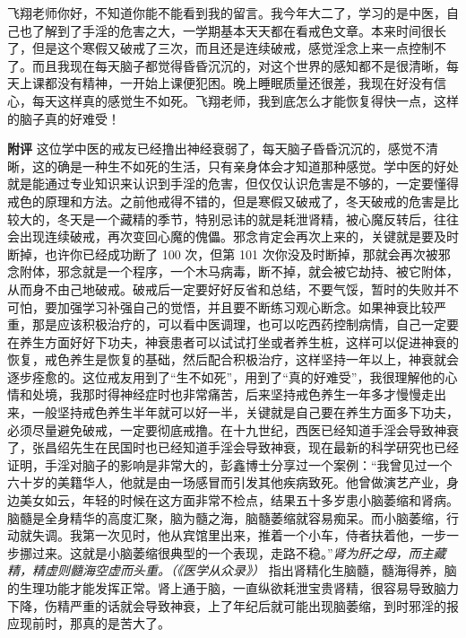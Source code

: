 \begin{case}
    飞翔老师你好，不知道你能不能看到我的留言。我今年大二了，学习的是中医，自己也了解到了手淫的危害之大，一学期基本天天都在看戒色文章。本来时间很长了，但是这个寒假又破戒了三次，而且还是连续破戒，感觉淫念上来一点控制不了。而且我现在每天脑子都觉得昏昏沉沉的，对这个世界的感知都不是很清晰，每天上课都没有精神，一开始上课便犯困。晚上睡眠质量还很差，我现在好没有信心，每天这样真的感觉生不如死。飞翔老师，我到底怎么才能恢复得快一点，这样的脑子真的好难受！

    \textbf{附评} 这位学中医的戒友已经撸出神经衰弱了，每天脑子昏昏沉沉的，感觉不清晰，这的确是一种生不如死的生活，只有亲身体会才知道那种感觉。学中医的好处就是能通过专业知识来认识到手淫的危害，但仅仅认识危害是不够的，一定要懂得戒色的原理和方法。之前他戒得不错的，但是寒假又破戒了，冬天破戒的危害是比较大的，冬天是一个藏精的季节，特别忌讳的就是耗泄肾精，被心魔反转后，往往会出现连续破戒，再次变回心魔的傀儡。邪念肯定会再次上来的，关键就是要及时断掉，也许你已经成功断了 100 次，但第 101 次你没及时断掉，那就会再次被邪念附体，邪念就是一个程序，一个木马病毒，断不掉，就会被它劫持、被它附体，从而身不由己地破戒。破戒后一定要好好反省和总结，不要气馁，暂时的失败并不可怕，要加强学习补强自己的觉悟，并且要不断练习观心断念。如果神衰比较严重，那是应该积极治疗的，可以看中医调理，也可以吃西药控制病情，自己一定要在养生方面好好下功夫，神衰患者可以试试打坐或者养生桩，这样可以促进神衰的恢复，戒色养生是恢复的基础，然后配合积极治疗，这样坚持一年以上，神衰就会逐步痊愈的。这位戒友用到了“生不如死”，用到了“真的好难受”，我很理解他的心情和处境，我那时得神经症时也非常痛苦，后来坚持戒色养生一年多才慢慢走出来，一般坚持戒色养生半年就可以好一半，关键就是自己要在养生方面多下功夫，必须尽量避免破戒，一定要彻底戒撸。在十九世纪，西医已经知道手淫会导致神衰了，张昌绍先生在民国时也已经知道手淫会导致神衰，现在最新的科学研究也已经证明，手淫对脑子的影响是非常大的，彭鑫博士分享过一个案例：“我曾见过一个六十岁的美籍华人，他就是由一场感冒而引发其他疾病致死。他曾做演艺产业，身边美女如云，年轻的时候在这方面非常不检点，结果五十多岁患小脑萎缩和肾病。脑髓是全身精华的高度汇聚，脑为髓之海，脑髓萎缩就容易痴呆。而小脑萎缩，行动就失调。我第一次见时，他从宾馆里出来，推着一个小车，侍者扶着他，一步一步挪过来。这就是小脑萎缩很典型的一个表现，走路不稳。”\textit{肾为肝之母，而主藏精，精虚则髓海空虚而头重。（《医学从众录》）} 指出肾精化生脑髓，髓海得养，脑的生理功能才能发挥正常。肾上通于脑，一直纵欲耗泄宝贵肾精，很容易导致脑力下降，伤精严重的话就会导致神衰，上了年纪后就可能出现脑萎缩，到时邪淫的报应现前时，那真的是苦大了。
\end{case}

